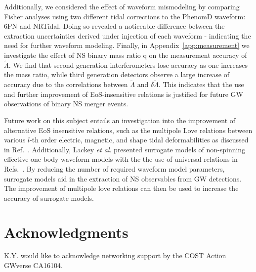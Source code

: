 \documentclass[prd,twocolumn,nofootinbib,superscriptaddress,amsmath,amssymb]{revtex4-1}
\begin{document}
Additionally, we considered the effect of waveform mismodeling by comparing Fisher analyses using two different tidal corrections to the PhenomD waveform: 6PN and NRTidal.
Doing so revealed a noticeable difference between the extraction uncertainties derived under injection of each waveform - indicating the need for further waveform modeling.
Finally, in Appendix~\ref{app:measurement} we investigate the effect of NS binary mass ratio q on the measurement accuracy of $\tilde\Lambda$.
We find that second generation interferometers lose accuracy as one increases the mass ratio, while third generation detectors observe a large increase of accuracy due to the correlations between $\tilde\Lambda$ and $\delta\tilde\Lambda$.
This indicates that the use and further improvement of EoS-insensitive relations is justified for future GW observations of binary NS merger events.

Future work on this subject entails an investigation into the improvement of alternative EoS insensitive relations, such as the multipole Love relations between various $l$-th order electric, magnetic, and shape tidal deformabilities as discussed in Ref.~\cite{Yagi:Multipole}.
Additionally, Lackey \emph{et al}. presented surrogate models of non-spinning effective-one-body waveform models with the the use of universal relations in Refs.~\cite{Lackey:Surrogate, Lackey:EOB}.
By reducing the number of required waveform model parameters, surrogate models aid in the extraction of NS observables from GW detections.
The improvement of multipole love relations can then be used to increase the accuracy of surrogate models.

\section*{Acknowledgments}\label{acknowledgments}
K.Y. would like to acknowledge networking support by the COST Action GWverse CA16104.

\appendix
\end{document}

